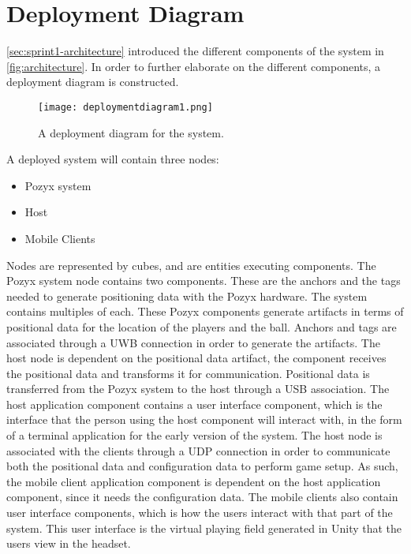 \section{Deployment Diagram}\label{sec:sprint2-deploymentdia}
\autoref{sec:sprint1-architecture} introduced the different components of the system in \autoref{fig:architecture}.
In order to further elaborate on the different components, a deployment diagram is constructed.
\begin{figure}[H]
    \centering
    \texttt{[image: deploymentdiagram1.png]}
    \caption{A deployment diagram for the system.}
    \label{fig:sprint2-deployment}
\end{figure}
\noindent
A deployed system will contain three nodes:
\begin{itemize}
    \item Pozyx system
    \item Host
    \item Mobile Clients
\end{itemize}
Nodes are represented by cubes, and are entities executing components.
The Pozyx system node contains two components.
These are the anchors and the tags needed to generate positioning data with the Pozyx hardware.
The system contains multiples of each.
These Pozyx components generate artifacts in terms of positional data for the location of the players and the ball.
Anchors and tags are associated through a UWB connection in order to generate the artifacts.
The host node is dependent on the positional data artifact, the component receives the positional data and transforms it for communication.
Positional data is transferred from the Pozyx system to the host through a USB association.
The host application component contains a user interface component, which is the interface that the person using the host component will interact with, in the form of a terminal application for the early version of the system.
The host node is associated with the clients through a UDP connection in order to communicate both the positional data and configuration data to perform game setup.
As such, the mobile client application component is dependent on the host application component, since it needs the configuration data.
The mobile clients also contain user interface components, which is how the users interact with that part of the system.
This user interface is the virtual playing field generated in Unity that the users view in the headset.
